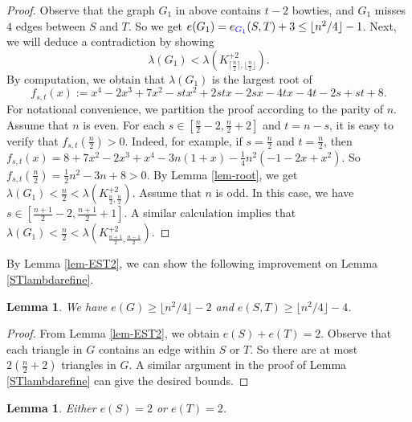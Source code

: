\documentclass[11pt]{article}
\newtheorem{lemma}[theorem]{Lemma}
\newcommand{\blue}{\color{blue}}
\begin{document}
\begin{proof}
 Observe that the graph $G_1$ in above contains $t-2$ bowties, 
 and $G_1$ misses $4$ edges between $S$ and $T$. 
 So we get $e(G_1)=e_{{\blue G_1}}(S,T) +3 \le \lfloor n^2/4\rfloor -1$.  
Next, we will deduce a contradiction by showing 
\[ \lambda (G_1) < 
\lambda (K_{\lceil \frac{n}{2} \rceil,\lfloor \frac{n}{2} \rfloor}^{+2}). \]  
By computation, we obtain that 
$\lambda (G_1)$ is the largest root of 
\[  f_{s,t}(x) := x^4  - 2 x^3 + 7 x^2 -s t x^2 
 + 2 s t x - 2 s x  - 4 t x - 4 t  - 2 s + s t  + 8. \]
 For notational convenience, 
we partition the proof 
according to the parity of $n$. 
Assume that $n$ is even. 
For each $s\in [\frac{n}{2} -2 ,\frac{n}{2} +2]$ and $t=n-s$, 
it is easy to verify that 
$f_{s,t}(\frac{n}{2}) >0$. 
Indeed, for example, if $s= \frac{n}{2}$ and 
$t=\frac{n}{2} $, then 
$ f_{s,t}(x) = 8 + 7 x^2 - 2 x^3 + x^4 - 3 n (1 + x) 
- \frac{1}{4} n^2 (-1 - 2 x + x^2)$. 
So $f_{s,t}(\frac{n}{2}) = \frac{1}{2} n^2 - 3 n +8>0$.  
By Lemma \ref{lem-root}, we get 
$  \lambda (G_1)< \frac{n}{2} < 
\lambda (K_{\frac{n}{2}, \frac{n}{2}}^{+2})$.  
 Assume that $n$ is odd. 
In this case, we have
 $s\in [\frac{n+1}{2} -2,  \frac{n+1}{2} +1]$. 
A similar calculation implies that 
$\lambda (G_1)< \frac{n}{2} < \lambda (K_{\frac{n+1}{2}, \frac{n-1}{2}}^{+2})$. 
\end{proof}

By Lemma \ref{lem-EST2},  
we can show the following 
improvement on Lemma \ref{STlambdarefine}. 

\begin{lemma}\label{ST-refine}
We have
$e(G)\ge \lfloor {n^2}/{4} \rfloor - 2$ 
and 
$e(S,T) \ge \lfloor {n^2}/{4} \rfloor - 4$. 
\end{lemma}


\begin{proof}
From Lemma \ref{lem-EST2}, 
we obtain $e(S) + e(T)=2$. 
Observe that each triangle in $G$ contains an edge within $S$ or $T$. 
So there are at most $2(\frac{n}{2} + 2)$ triangles in $G$. A similar argument in the proof of Lemma \ref{STlambdarefine} can give the desired bounds. 
\end{proof}


\begin{lemma} \label{SorT=2}
Either $e(S)=2$ or $e(T)=2$. 
\end{lemma}
\end{document}
